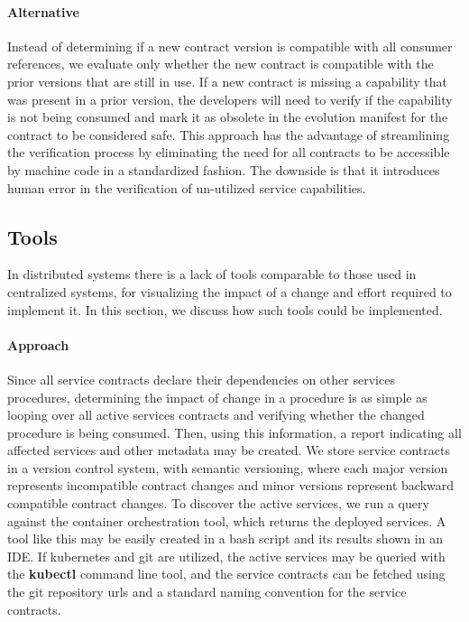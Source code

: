 \paragraph{Alternative}
Instead of determining if a new contract version is compatible with all consumer references,
we evaluate only whether the new contract is compatible with the prior versions that are still in use.
If a new contract is missing a capability that was present in a prior version,
the developers will need to verify if the capability is not being consumed
and mark it as obsolete in the evolution manifest for the contract to be considered safe.
This approach has the advantage of streamlining the verification process by eliminating the
need for all contracts to be accessible by machine code in a standardized fashion.
The downside is that it introduces human error in the verification of un-utilized service capabilities.

\subsection{Tools} %
\label{sec:tools}

In distributed systems there is a lack of tools
comparable to those used in centralized systems, for visualizing the impact of a change and effort required to implement it.
In this section, we discuss how such tools could be implemented.

\paragraph{Approach}
Since all service contracts declare their dependencies on other services procedures, determining the impact of change in a procedure is as simple as
looping over all active services contracts and verifying whether the changed procedure is being consumed.
Then, using this information, a report indicating all affected services and other metadata may be created.
We store service contracts in a version control system, with semantic versioning, where
each major version represents incompatible contract changes and minor versions represent backward compatible contract changes.
To discover the active services, we run a query against the container orchestration tool, which returns the deployed services.
A tool like this may be easily created in a bash script and its results shown in an IDE.
If kubernetes and git are utilized, the active services may be queried with the \textbf{kubectl} command line tool,
and the service contracts can be fetched using the git repository urls and a standard naming convention for the service contracts.

